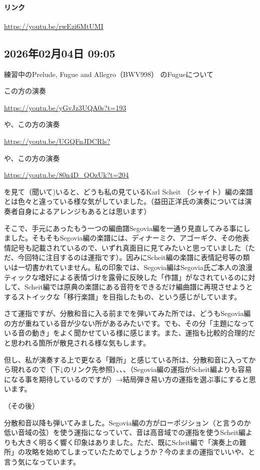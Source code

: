 \paragraph{リンク}
\url{https://youtu.be/rwEzi6MtUMI}

\subsection*{2026年02月04日 09:05}

練習中のPrelude, Fugue and Allegro（BWV998） のFugueについて

この方の演奏

\url{https://youtu.be/yGvJz3UQA0s?t=193}

や、この方の演奏

\url{https://youtu.be/UGQFnJDCRls?}

や、この方の演奏

\url{https://youtu.be/80n4D_QOzUk?t=204}

を見て（聞いて)いると、どうも私の見ているKarl Scheit （シャイト）編の楽譜とは色々と違っている様な気がしていました。（益田正洋氏の演奏については演奏者自身によるアレンジもあるとは思います）

そこで、手元にあったもう一つの編曲譜Segovia編を一通り見直してみる事にしました。そもそもSegovia編の楽譜には、ディナーミク、アゴーギク、その他表情記号も記載されているので、いずれ真面目に見てみたいと思っていました（ただ、今回特に注目するのは運指です）。因みにScheit編の楽譜に表情記号等の類いは一切書かれていません。私の印象では、Segovia編はSegovia氏ご本人の浪漫ティックな嗜好による表情づけを露骨に反映した「作譜」がなされているのに対して、Scheit編では原典の楽譜にある音符をできるだけ編曲譜に再現させようとするストイックな「移行楽譜」を目指したもの、という感じがしています。

さて運指ですが、分散和音に入る前までを弾いてみた所では、どうもSegovia編の方が重ねている音が少ない所があるみたいです。でも、その分「主題になっている音の動き」をよく聞かせている様に感じます。また、運指も比較的合理的だと思われる箇所が散見される様な気もします。

但し、私が演奏する上で更なる「難所」と感じている所は、分散和音に入ってから現れるので（下↓のリンク先参照）、、、（Segovia編の運指がScheit編よりも容易になる事を期待しているのですが）→結局弾き易い方の運指を選ぶ事にすると思います。

（その後）

分散和音以降も弾いてみました。Segovia編の方がローポジション（と言うのか低い音域の弦）を使う運指になっていて、音は高音域での運指を使うScheit編よりも大きく明るく響く印象はありました。ただ、既にScheit編で「演奏上の難所」の攻略を始めてしまっていたためでしょうか？今のままの運指でいいや、と言う気になっています。

